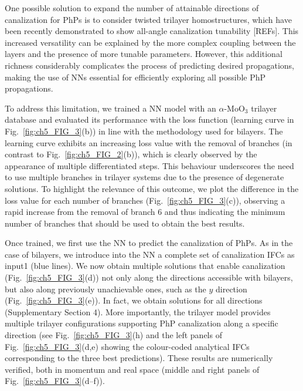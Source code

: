 One possible solution to expand the number of attainable directions of canalization for PhPs is to consider twisted trilayer homostructures, which have been recently demonstrated to show all-angle canalization tunability [REFs]. This increased versatility can be explained by the more complex coupling between the layers and the presence of more tunable parameters. However, this additional richness considerably complicates the process of predicting desired propagations, making the use of NNs essential for efficiently exploring all possible PhP propagations.

To address this limitation, we trained a NN model with an $\alpha\text{-}\mathrm{MoO}_3$ trilayer database and evaluated its performance with the loss function (learning curve in Fig.~\ref{fig:ch5_FIG_3}(b)) in line with the methodology used for bilayers. The learning curve exhibits an increasing loss value with the removal of branches (in contrast to Fig.~\ref{fig:ch5_FIG_2}(b)), which is clearly observed by the appearance of multiple differentiated steps. This behaviour underscores the need to use multiple branches in trilayer systems due to the presence of degenerate solutions. To highlight the relevance of this outcome, we plot the difference in the loss value for each number of branches (Fig.~\ref{fig:ch5_FIG_3}(c)), observing a rapid increase from the removal of branch 6 and thus indicating the minimum number of branches that should be used to obtain the best results.

Once trained, we first use the NN to predict the canalization of PhPs. As in the case of bilayers, we introduce into the NN a complete set of canalization IFCs as input1 (blue lines). We now obtain multiple solutions that enable canalization (Fig.~\ref{fig:ch5_FIG_3}(d)) not only along the directions accessible with bilayers, but also along previously unachievable ones, such as the $y$ direction (Fig.~\ref{fig:ch5_FIG_3}(e)). In fact, we obtain solutions for all directions (Supplementary Section 4). More importantly, the trilayer model provides multiple trilayer configurations supporting PhP canalization along a specific direction (see Fig.~\ref{fig:ch5_FIG_3}(h) and the left panels of Fig.~\ref{fig:ch5_FIG_3}(d,e) showing the colour-coded analytical IFCs corresponding to the three best predictions). These results are numerically verified, both in momentum and real space (middle and right panels of Fig.~\ref{fig:ch5_FIG_3}(d--f)).

